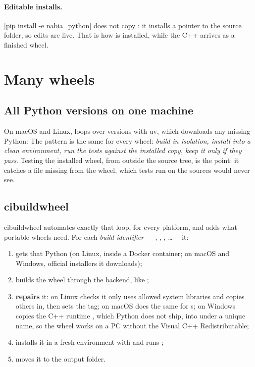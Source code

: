 \paragraph{Editable installs.} \cmd|pip install -e nabia_python| does not copy : it
installs a pointer to the source folder, so edits are live. That is how  is installed,
while the C++ arrives as a finished wheel.

\section{Many wheels}

\subsection{All Python versions on one machine}
On macOS and Linux,  loops over versions with uv, which downloads any
missing Python:
The pattern is the same for every wheel: \emph{build in isolation, install into a clean
environment, run the tests against the installed copy, keep it only if they pass}. Testing the
installed wheel, from outside the source tree, is the point: it catches a file missing from the
wheel, which tests run on the sources would never see.

\subsection{cibuildwheel}\label{t:sec:cibw}
cibuildwheel automates exactly that loop, for every platform, and adds what portable wheels need.
For each \emph{build identifier} --- , ,
, \dots --- it:
\begin{enumerate}
  \item gets that Python (on Linux, inside a  Docker container; on macOS and
        Windows, official installers it downloads);
  \item builds the wheel through the backend, like ;
  \item \textbf{repairs} it: on Linux  checks it only uses allowed system libraries
        and copies others in, then sets the  tag; on macOS  does the
        same for s; on Windows  copies the C++ runtime
        , which Python does not ship, into 
        under a unique name, so the wheel works on a PC without the Visual C++ Redistributable;
  \item installs it in a fresh environment with  and runs ;
  \item moves it to the output folder.
\end{enumerate}

